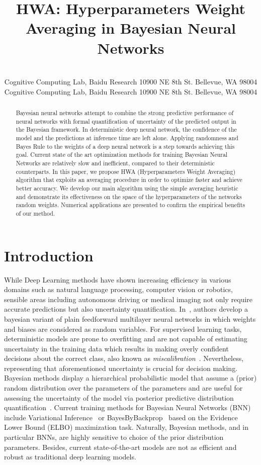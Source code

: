 \documentclass[tablecaption=bottom,wcp]{jmlr}
\title[Hyperparameters Weight Averaging in BNNs]{HWA: Hyperparameters Weight Averaging in Bayesian Neural Networks}
\author{%
 \Name{Belhal Karimi} \Email{belhal.karimi@gmail.com}\\
 \addr Cognitive Computing Lab, Baidu Research 10900 NE 8th St. Bellevue, WA 98004
 \AND
 \Name{Ping Li} \Email{pingli98@gmail.com}\\
 \addr Cognitive Computing Lab, Baidu Research 10900 NE 8th St. Bellevue, WA 98004
}
\begin{document}
\maketitle


\begin{abstract}
Bayesian neural networks attempt to combine the strong predictive performance of neural networks with formal quantification of uncertainty of the predicted output in the Bayesian framework.
In deterministic deep neural network, the confidence of the model and the predictions at inference time are left alone. 
Applying randomness and Bayes Rule to the weights of a deep neural network is a step towards achieving this goal. Current state of the art optimization methods for training Bayesian Neural Networks are relatively slow and inefficient, compared to their deterministic counterparts. 
In this paper, we propose \textsc{HWA} (Hyperparameters Weight Averaging) algorithm that exploits an averaging procedure in order to optimize faster and achieve better accuracy. 
We develop our main algorithm using the simple averaging heuristic and demonstrate its effectiveness on the space of the hyperparameters of the networks random weights. 
Numerical applications are presented to confirm the empirical benefits of our method.
\end{abstract}

\section{Introduction}
While Deep Learning methods have shown increasing efficiency in various domains such as natural language processing, computer vision or robotics, sensible areas including autonomous driving or medical imaging not only require accurate predictions but also uncertainty quantification.
In~\citep{neal2012bayesian}, authors develop a bayesian variant of plain feedforward multilayer neural networks in which weights and biases are considered as random variables.
For supervised learning tasks, deterministic models are prone to overfitting and are not capable of estimating uncertainty in the training data which results in making overly confident decisions about the correct class, also known as \emph{miscalibration}~\citep{guo2017calibration,kendall2017uncertainties}.
Nevertheless, representing that aforementioned uncertainty is crucial for decision making.
Bayesian methods display a hierarchical probabilistic model that assume a (prior) random distribution over the parameters of the parameters and are useful for assessing the uncertainty of the model via posterior predictive distribution quantification~\citep{blundell2015weight,kingma2015variational}.
Current training methods for Bayesian Neural Networks (BNN)~\citep{neal2012bayesian} include Variational Inference~\citep{graves2011practical, hoffman2013stochastic} or BayesByBackprop~\citep{blundell2015weight} based on the Evidence Lower Bound (ELBO) maximization task.
Naturally, Bayesian methods, and in particular BNNs, are highly sensitive to choice of the prior distribution parameters.
Besides, current state-of-the-art models are not as efficient and robust as traditional deep learning models.
\end{document}
